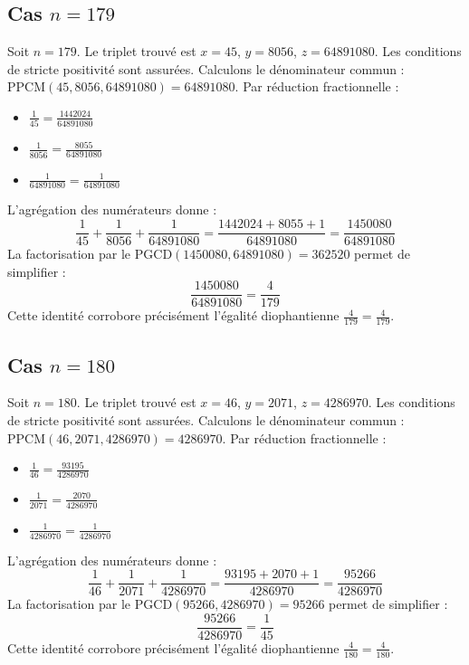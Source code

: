 \documentclass[11pt,a4paper]{article}
\begin{document}
\subsection{Cas $n = 179$}
Soit $n = 179$. Le triplet trouvé est $x = 45$, $y = 8056$, $z = 64891080$.
Les conditions de stricte positivité sont assurées.
Calculons le dénominateur commun : $\text{PPCM}(45, 8056, 64891080) = 64891080$.
Par réduction fractionnelle :
\begin{itemize}
    \item $\frac{1}{45} = \frac{1442024}{64891080}$
    \item $\frac{1}{8056} = \frac{8055}{64891080}$
    \item $\frac{1}{64891080} = \frac{1}{64891080}$
\end{itemize}
L'agrégation des numérateurs donne :
$$ \frac{1}{45} + \frac{1}{8056} + \frac{1}{64891080} = \frac{1442024 + 8055 + 1}{64891080} = \frac{1450080}{64891080} $$
La factorisation par le $\text{PGCD}(1450080, 64891080) = 362520$ permet de simplifier :
$$ \frac{1450080}{64891080} = \frac{4}{179} $$
Cette identité corrobore précisément l'égalité diophantienne $\frac{4}{179} = \frac{4}{179}$.

\subsection{Cas $n = 180$}
Soit $n = 180$. Le triplet trouvé est $x = 46$, $y = 2071$, $z = 4286970$.
Les conditions de stricte positivité sont assurées.
Calculons le dénominateur commun : $\text{PPCM}(46, 2071, 4286970) = 4286970$.
Par réduction fractionnelle :
\begin{itemize}
    \item $\frac{1}{46} = \frac{93195}{4286970}$
    \item $\frac{1}{2071} = \frac{2070}{4286970}$
    \item $\frac{1}{4286970} = \frac{1}{4286970}$
\end{itemize}
L'agrégation des numérateurs donne :
$$ \frac{1}{46} + \frac{1}{2071} + \frac{1}{4286970} = \frac{93195 + 2070 + 1}{4286970} = \frac{95266}{4286970} $$
La factorisation par le $\text{PGCD}(95266, 4286970) = 95266$ permet de simplifier :
$$ \frac{95266}{4286970} = \frac{1}{45} $$
Cette identité corrobore précisément l'égalité diophantienne $\frac{4}{180} = \frac{4}{180}$.
\end{document}
